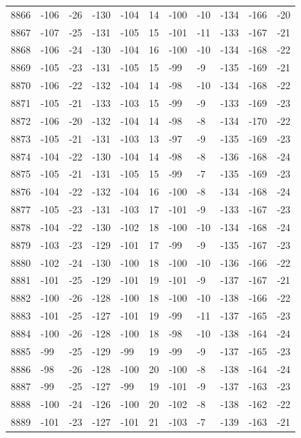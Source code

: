 \begin{table}[H]
\begin{tabular}{lllllllllll}
8866 & -106 & -26 & -130 & -104 & 14 & -100 & -10 & -134 & -166 & -20 \\
8867 & -107 & -25 & -131 & -105 & 15 & -101 & -11 & -133 & -167 & -21 \\
8868 & -106 & -24 & -130 & -104 & 16 & -100 & -10 & -134 & -168 & -22 \\
8869 & -105 & -23 & -131 & -105 & 15 & -99 & -9 & -135 & -169 & -21 \\
8870 & -106 & -22 & -132 & -104 & 14 & -98 & -10 & -134 & -168 & -22 \\
8871 & -105 & -21 & -133 & -103 & 15 & -99 & -9 & -133 & -169 & -23 \\
8872 & -106 & -20 & -132 & -104 & 14 & -98 & -8 & -134 & -170 & -22 \\
8873 & -105 & -21 & -131 & -103 & 13 & -97 & -9 & -135 & -169 & -23 \\
8874 & -104 & -22 & -130 & -104 & 14 & -98 & -8 & -136 & -168 & -24 \\
8875 & -105 & -21 & -131 & -105 & 15 & -99 & -7 & -135 & -169 & -23 \\
8876 & -104 & -22 & -132 & -104 & 16 & -100 & -8 & -134 & -168 & -24 \\
8877 & -105 & -23 & -131 & -103 & 17 & -101 & -9 & -133 & -167 & -23 \\
8878 & -104 & -22 & -130 & -102 & 18 & -100 & -10 & -134 & -168 & -24 \\
8879 & -103 & -23 & -129 & -101 & 17 & -99 & -9 & -135 & -167 & -23 \\
8880 & -102 & -24 & -130 & -100 & 18 & -100 & -10 & -136 & -166 & -22 \\
8881 & -101 & -25 & -129 & -101 & 19 & -101 & -9 & -137 & -167 & -21 \\
8882 & -100 & -26 & -128 & -100 & 18 & -100 & -10 & -138 & -166 & -22 \\
8883 & -101 & -25 & -127 & -101 & 19 & -99 & -11 & -137 & -165 & -23 \\
8884 & -100 & -26 & -128 & -100 & 18 & -98 & -10 & -138 & -164 & -24 \\
8885 & -99 & -25 & -129 & -99 & 19 & -99 & -9 & -137 & -165 & -23 \\
8886 & -98 & -26 & -128 & -100 & 20 & -100 & -8 & -138 & -164 & -24 \\
8887 & -99 & -25 & -127 & -99 & 19 & -101 & -9 & -137 & -163 & -23 \\
8888 & -100 & -24 & -126 & -100 & 20 & -102 & -8 & -138 & -162 & -22 \\
8889 & -101 & -23 & -127 & -101 & 21 & -103 & -7 & -139 & -163 & -21 \\

\end{tabular}
\end{table}
